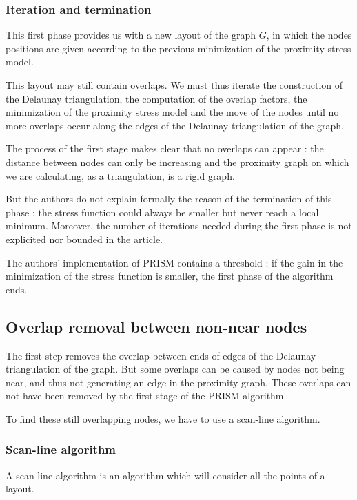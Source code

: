 \documentclass[12pt]{report}
\begin{document}
\subsubsection{Iteration and termination}
This first phase provides us with a new layout of the graph $G$, in which the nodes positions are given according to the previous minimization of the proximity stress model.

This layout may still contain overlaps. We must thus iterate the construction of the Delaunay triangulation, the computation of the overlap factors, the minimization of the proximity stress model and the move of the nodes until no more overlaps occur along the edges of the Delaunay triangulation of the graph.

\bigskip
The process of the first stage makes clear that no overlaps can appear : the distance between nodes can only be increasing and the proximity graph on which we are calculating, as a triangulation, is a rigid graph.

But the authors do not explain formally the reason of the termination of this phase : the stress function could always be smaller but never reach a local minimum. Moreover, the number of iterations needed during the first phase is not explicited nor bounded in the article.

The authors' implementation of PRISM contains a threshold : if the gain in the minimization of the stress function is smaller, the first phase of the algorithm ends.


\subsection{Overlap removal between non-near nodes}

The first step removes the overlap between ends of edges of the Delaunay triangulation of the graph. But some overlaps can be caused by nodes not being near, and thus not generating an edge in the proximity graph. These overlaps can not have been removed by the first stage of the PRISM algorithm.

To find these still overlapping nodes, we have to use a scan-line algorithm.
\subsubsection{Scan-line algorithm}

A scan-line algorithm is an algorithm which will consider all the points of a layout.
\end{document}
